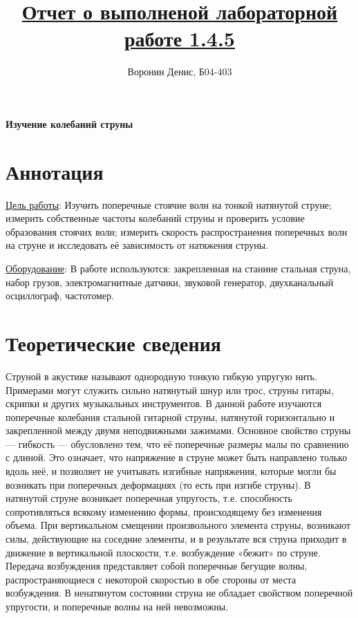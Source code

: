 \documentclass[a4paper]{article}
\title{\underline{Отчет о выполненой лабораторной работе 1.4.5}}
\author{Воронин Денис, Б04-403}
\begin{document}
\maketitle

\begin{center}
\textbf{\Large Изучение колебаний струны}
\end{center}

\section{Аннотация}
\underline{Цель работы}: 
Изучить поперечные стоячие волн на тонкой натянутой струне; измерить собственные частоты колебаний струны и проверить условие образования стоячих волн; измерить скорость распространения поперечных волн на струне и исследовать её зависимость от натяжения струны.

\underline{Оборудование}: 
В работе используются: закрепленная на станине стальная струна, набор грузов, электромагнитные датчики, звуковой генератор, двухканальный осциллограф, частотомер.

\section{Теоретические сведения}\par

Струной в акустике называют однородную тонкую гибкую упругую нить. Примерами могут служить сильно натянутый шнур или трос, струны гитары, скрипки и других музыкальных инструментов. В данной работе изучаются поперечные колебания стальной гитарной струны, натянутой горизонтально и закрепленной между двумя неподвижными зажимами. Основное свойство струны — гибкость — обусловлено тем, что её поперечные размеры малы по сравнению с длиной. Это означает, что напряжение в струне может быть направлено только вдоль неё, и позволяет не учитывать изгибные напряжения, которые могли бы возникать при поперечных деформациях (то есть при изгибе струны).
В натянутой струне возникает поперечная упругость, т.е. способность сопротивляться всякому изменению формы, происходящему без изменения объема. При вертикальном смещении произвольного элемента струны, возникают силы, действующие на соседние элементы, и в результате вся струна приходит в движение в вертикальной плоскости, т.е. возбуждение «бежит» по струне. Передача возбуждения представляет собой поперечные бегущие волны, распространяющиеся с некоторой скоростью в обе стороны от места возбуждения. В ненатянутом состоянии струна не обладает свойством поперечной упругости, и поперечные волны на ней невозможны.
\end{document}
